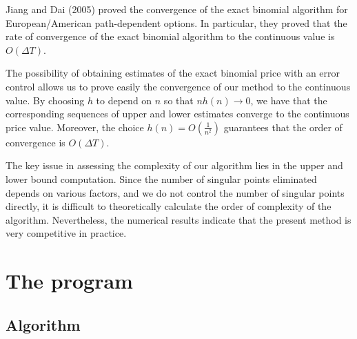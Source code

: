 \begin{rem}
	Jiang and Dai (2005) \cite{Jiang2004} proved the convergence of the exact binomial algorithm for European/American path-dependent options. In particular, they proved that the rate of convergence of the exact binomial algorithm to the continuous value is $ O( \Delta T ) $.
\end{rem}

The possibility of obtaining estimates of the exact binomial price with an error control allows us to prove easily the convergence of our method to the continuous value. By choosing $ h $ to depend on $ n $ so that $ n h(n) \to 0 $, we have that the corresponding sequences of upper and lower estimates converge to the continuous price value. Moreover, the choice $ h(n) = O(\frac{1}{n^2}) $ guarantees that the order of convergence is $ O( \Delta T ) $.

\begin{rem}
	The key issue in assessing the complexity of our algorithm lies in the upper and lower bound computation. Since the number of singular points eliminated depends on various factors, and we do not control the number of singular points directly, it is difficult to theoretically calculate the order of complexity of the algorithm. Nevertheless, the numerical results indicate
	that the present method is very competitive in practice.
\end{rem}



\clearpage
\section{The program}
\label{sec:asian-program}

\subsection{Algorithm}

